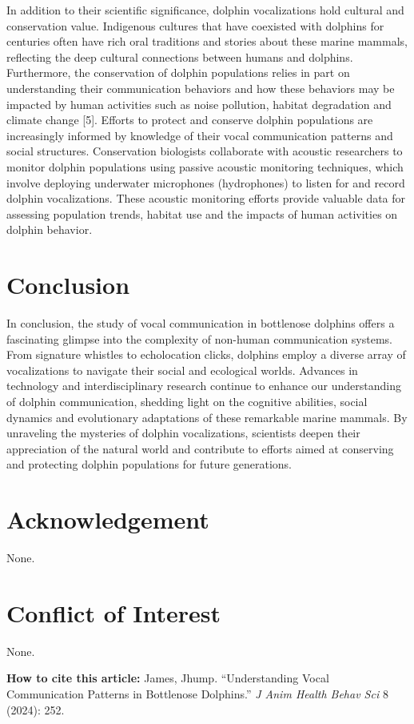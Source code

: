 \documentclass{article}
\begin{document}
\begin{multicols}{2}
In addition to their scientific significance, dolphin vocalizations hold cultural and conservation value. Indigenous cultures that have coexisted with dolphins for centuries often have rich oral traditions and stories about these marine mammals, reflecting the deep cultural connections between humans and dolphins. Furthermore, the conservation of dolphin populations relies in part on understanding their communication behaviors and how these behaviors may be impacted by human activities such as noise pollution, habitat degradation and climate change [5]. Efforts to protect and conserve dolphin populations are increasingly informed by knowledge of their vocal communication patterns and social structures. Conservation biologists collaborate with acoustic researchers to monitor dolphin populations using passive acoustic monitoring techniques, which involve deploying underwater microphones (hydrophones) to listen for and record dolphin vocalizations. These acoustic monitoring efforts provide valuable data for assessing population trends, habitat use and the impacts of human activities on dolphin behavior.


\section*{Conclusion}
In conclusion, the study of vocal communication in bottlenose dolphins offers a fascinating glimpse into the complexity of non-human communication systems. From signature whistles to echolocation clicks, dolphins employ a diverse array of vocalizations to navigate their social and ecological worlds. Advances in technology and interdisciplinary research continue to enhance our understanding of dolphin communication, shedding light on the cognitive abilities, social dynamics and evolutionary adaptations of these remarkable marine mammals. By unraveling the mysteries of dolphin vocalizations, scientists deepen their appreciation of the natural world and contribute to efforts aimed at conserving and protecting dolphin populations for future generations.

\section*{Acknowledgement}
None.
\section*{Conflict of Interest}
None.

\begin{framed}
\noindent\fontsize{8.5}{10.2}\selectfont
\textbf{How to cite this article:} James, Jhump. “Understanding Vocal Communication Patterns in Bottlenose Dolphins.” \textit{J Anim Health Behav Sci} 8 (2024): 252.
\end{framed}


\end{multicols}
\end{document}
